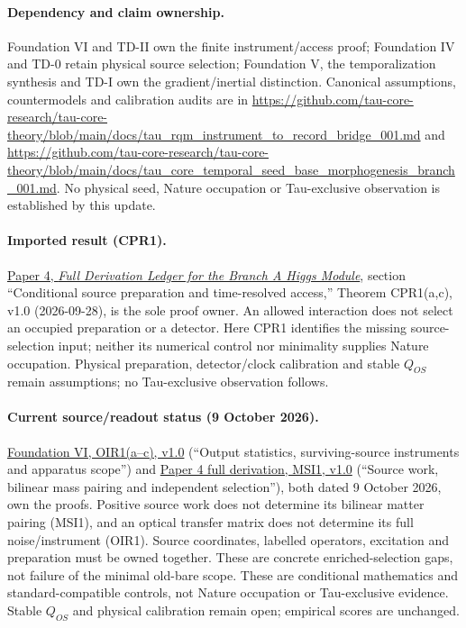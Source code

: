 \documentclass[11pt]{article}
\begin{document}
\paragraph{Dependency and claim ownership.}
Foundation VI and TD-II own the finite instrument/access proof; Foundation IV and TD-0 retain physical source selection; Foundation V, the temporalization synthesis and TD-I own the gradient/inertial distinction. Canonical assumptions, countermodels and calibration audits are in \url{https://github.com/tau-core-research/tau-core-theory/blob/main/docs/tau_rqm_instrument_to_record_bridge_001.md} and \url{https://github.com/tau-core-research/tau-core-theory/blob/main/docs/tau_core_temporal_seed_base_morphogenesis_branch_001.md}. No physical seed, Nature occupation or Tau-exclusive observation is established by this update.

\paragraph{Imported result (CPR1).}
\href{https://github.com/tau-core-research/tau-core-higgs-module-paper4/blob/main/paper4_full_derivation/full_derivation.pdf#nameddest=cpr1}{Paper 4, \emph{Full Derivation Ledger for the Branch A Higgs Module}}, section ``Conditional source preparation and time-resolved access,'' Theorem CPR1(a,c), v1.0 (2026-09-28), is the sole proof owner.
An allowed interaction does not select an occupied preparation or a detector. Here CPR1 identifies the missing source-selection input; neither its numerical control nor minimality supplies Nature occupation.
Physical preparation, detector/clock calibration and stable $Q_{OS}$ remain assumptions; no Tau-exclusive observation follows.

\paragraph{Current source/readout status (9 October 2026).}
\href{https://github.com/tau-core-research/tau-core-quantum-readout-foundation-paper-vi/blob/main/paperVI_submission_source/main.pdf#nameddest=oir1}{Foundation VI, OIR1(a--c), v1.0} (``Output statistics, surviving-source instruments and apparatus scope'') and \href{https://github.com/tau-core-research/tau-core-higgs-module-paper4/blob/main/paper4_full_derivation/full_derivation.pdf#nameddest=msi1}{Paper 4 full derivation, MSI1, v1.0} (``Source work, bilinear mass pairing and independent selection''), both dated 9 October 2026, own the proofs.
Positive source work does not determine its bilinear matter pairing (MSI1), and an optical transfer matrix does not determine its full noise/instrument (OIR1). Source coordinates, labelled operators, excitation and preparation must be owned together. These are concrete enriched-selection gaps, not failure of the minimal old-bare scope.
These are conditional mathematics and standard-compatible controls, not Nature occupation or Tau-exclusive evidence. Stable $Q_{OS}$ and physical calibration remain open; empirical scores are unchanged.
\end{document}
